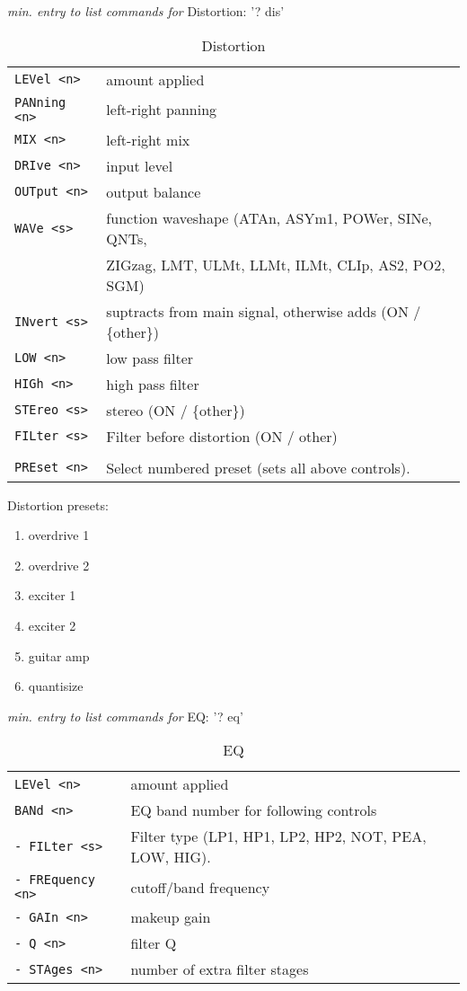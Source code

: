    \textsl{min. entry to list commands for} Distortion:  '? dis'
   \begin{table}[H]
      \centering
      \caption{Distortion}
      \begin{tabular}{l l}
\texttt{LEVel <n>} &
   amount applied \\
\texttt{PANning <n>} &
   left-right panning \\
\texttt{MIX <n>} &
   left-right mix \\
\texttt{DRIve <n>} &
   input level \\
\texttt{OUTput <n>} &
   output balance \\
\texttt{WAVe <s>} &
   function waveshape (ATAn, ASYm1, POWer, SINe, QNTs,\\
\texttt{ } &
    ZIGzag, LMT, ULMt, LLMt, ILMt, CLIp, AS2, PO2, SGM) \\
\texttt{INvert <s>} &
   suptracts from main signal, otherwise adds (ON / \{other\}) \\
\texttt{LOW <n>} &
   low pass filter \\
\texttt{HIGh <n>} &
   high pass filter \\
\texttt{STEreo <s>} &
   stereo (ON / \{other\}) \\
\texttt{FILter <s>} &
   Filter before distortion (ON / other) \\
\texttt{} & \\ %
\texttt{PREset <n>} &
   Select numbered preset (sets all above controls). \\
      \end{tabular}
   \end{table}
\pagebreak
Distortion presets:
   \begin{enumerate}
   \item overdrive 1
   \item overdrive 2
   \item exciter 1
   \item exciter 2
   \item guitar amp
   \item quantisize
   \end{enumerate}

   \textsl{min. entry to list commands for} EQ:  '? eq'
   \begin{table}[H]
      \centering
      \caption{EQ}
      \begin{tabular}{l l}
\texttt{LEVel <n>} &
   amount applied \\
\texttt{BANd <n>} &
   EQ band number for following controls \\
\texttt{- FILter <s>} &
   Filter type (LP1, HP1, LP2, HP2, NOT, PEA, LOW, HIG). \\
\texttt{- FREquency <n>} &
   cutoff/band frequency \\
\texttt{- GAIn <n>} &
   makeup gain \\
\texttt{- Q <n>} &
   filter Q \\
\texttt{- STAges <n>} &
   number of extra filter stages \\
      \end{tabular}
   \end{table}

